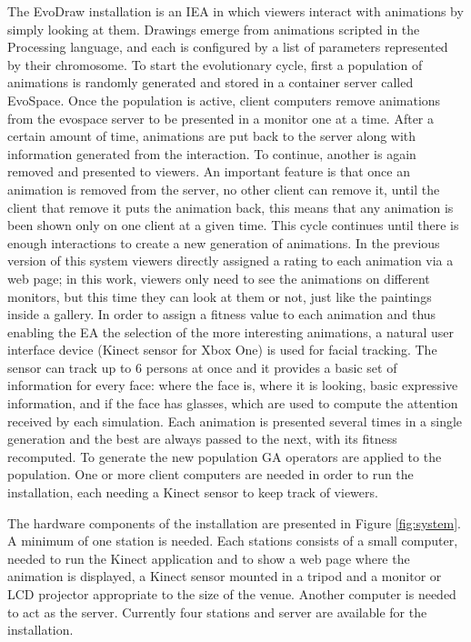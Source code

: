 \documentclass[letterpaper]{article}
\begin{document}
The EvoDraw installation is an IEA in which viewers interact with animations by simply
looking at them. Drawings emerge from animations scripted in the Processing 
language, and each is configured by a list of parameters represented by their
chromosome. To start the evolutionary cycle, first a population of animations is 
randomly generated and stored in a container server called EvoSpace. Once the population is active, 
client computers remove animations from the evospace server to be presented in a monitor
one at a time. After a certain amount of time, animations are put back to the server along 
with information generated from the interaction. To continue, another is again removed and presented
to viewers. An important feature is that once an animation is removed from the server,
no other client can remove it, until the client that remove it puts the animation back, this means that any
animation is been shown only
on one client at a given time. This cycle continues until there is enough interactions to create a new
generation of animations. In the previous version of this system \citep{garcia2013evospace} 
viewers directly assigned a rating to each animation via a web page; in this work, viewers
only need to see the animations on different monitors, but this time they can look at them or not, just like
the paintings inside a gallery. In order to assign a fitness value to each animation and thus 
enabling the EA the selection of the more interesting animations, 
a natural user interface device (Kinect sensor for Xbox One)
is used for facial tracking. The sensor can track up to 6 persons at once and  
it provides a basic set of information for every face: where the face is, where it is looking, 
basic expressive information, and if the face has glasses, which are used to compute the attention received by each simulation. Each animation is 
presented several times in a single generation and the best are always passed to the next, with its fitness recomputed. To generate the new population GA operators
are applied to the population. One or more client computers are needed in order to run the 
installation, each needing a Kinect sensor to keep track of viewers. 


The hardware components of the installation are presented in Figure \ref{fig:system}. A
minimum of one station is needed. Each stations consists of a small computer, needed 
to run the Kinect application and to show a web page where the animation is displayed, 
a Kinect sensor mounted in a tripod and a monitor or LCD projector appropriate to the
size of the venue. Another computer is needed to act as the server. Currently four stations
and server are available for the installation.  
\end{document}
